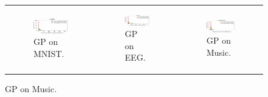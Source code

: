 \documentclass[conference]{IEEEtran}
\begin{document}
\begin{figure}[t]
\centering
\begin{tabular}{lll}

\begin{subfigure}[b]{0.31\textwidth}
\includegraphics[scale=0.445]{figs_pdf/GP_MNIST.pdf}
\caption{GP on MNIST.}
\end{subfigure}
&
\begin{subfigure}[b]{0.31\textwidth}
\includegraphics[scale=0.445]{figs_pdf/GP_EEG.pdf}
\caption{GP on EEG.}
\end{subfigure}
&
\begin{subfigure}[b]{0.31\textwidth}
\includegraphics[scale=0.445]{figs_pdf/GPDouble_Music.pdf}
\caption{GP on Music.}
\end{subfigure}
\\


\end{tabular}
\end{figure}
\end{document}
